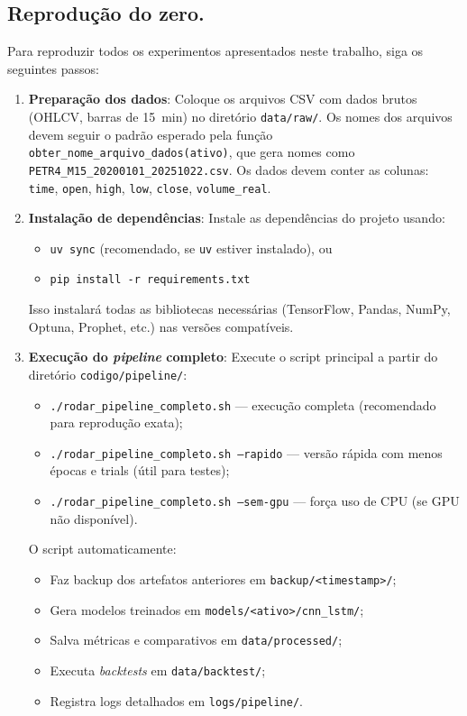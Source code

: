 \subsection{Reprodução do zero.}
Para reproduzir todos os experimentos apresentados neste trabalho, siga os seguintes passos:

\begin{enumerate}
  \item \textbf{Preparação dos dados}: Coloque os arquivos CSV com dados brutos (OHLCV, barras de 15~min) no diretório \texttt{data/raw/}.
        Os nomes dos arquivos devem seguir o padrão esperado pela função \texttt{obter\_nome\_arquivo\_dados(ativo)}, que gera nomes como \texttt{PETR4\_M15\_20200101\_20251022.csv}.
        Os dados devem conter as colunas: \texttt{time}, \texttt{open}, \texttt{high}, \texttt{low}, \texttt{close}, \texttt{volume\_real}.
        
  \item \textbf{Instalação de dependências}: Instale as dependências do projeto usando:
        \begin{itemize}
          \item \texttt{uv sync} (recomendado, se \texttt{uv} estiver instalado), ou
          \item \texttt{pip install -r requirements.txt}
        \end{itemize}
        Isso instalará todas as bibliotecas necessárias (TensorFlow, Pandas, NumPy, Optuna, Prophet, etc.) nas versões compatíveis.
        
  \item \textbf{Execução do \textit{pipeline} completo}: Execute o script principal a partir do diretório \texttt{codigo/pipeline/}:
        \begin{itemize}
          \item \texttt{./rodar\_pipeline\_completo.sh} --- execução completa (recomendado para reprodução exata);
          \item \texttt{./rodar\_pipeline\_completo.sh --rapido} --- versão rápida com menos épocas e trials (útil para testes);
          \item \texttt{./rodar\_pipeline\_completo.sh --sem-gpu} --- força uso de CPU (se GPU não disponível).
        \end{itemize}
        
        O script automaticamente:
        \begin{itemize}
          \item Faz backup dos artefatos anteriores em \texttt{backup/<timestamp>/};
          \item Gera modelos treinados em \texttt{models/<ativo>/cnn\_lstm/};
          \item Salva métricas e comparativos em \texttt{data/processed/};
          \item Executa \textit{backtests} em \texttt{data/backtest/};
          \item Registra logs detalhados em \texttt{logs/pipeline/}.
        \end{itemize}
\end{enumerate}

